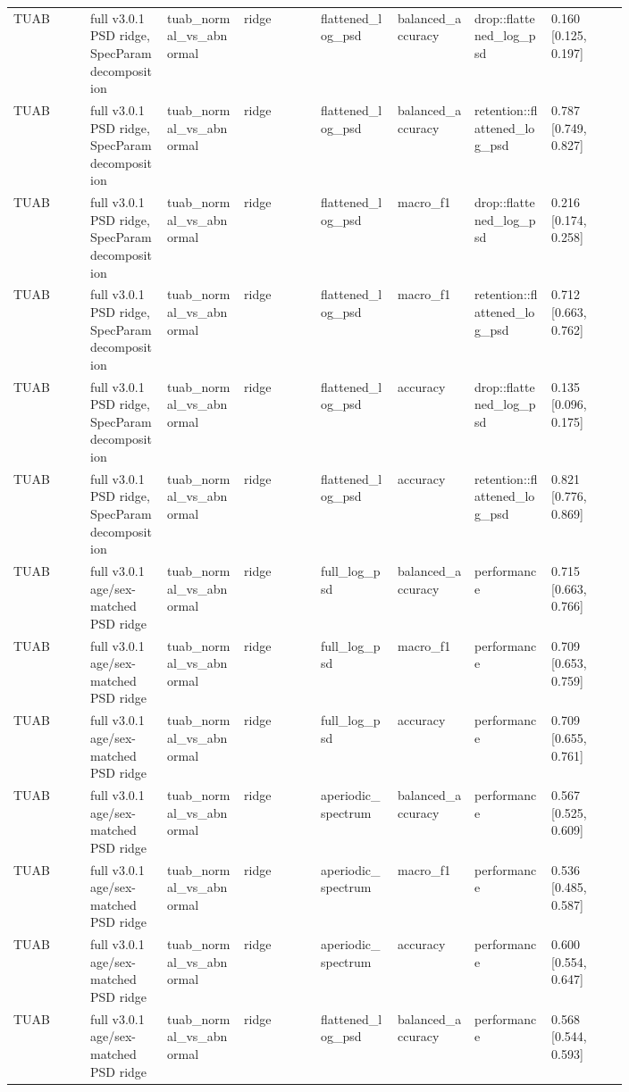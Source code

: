 \begin{longtable}{p{0.10\linewidth}p{0.10\linewidth}p{0.10\linewidth}p{0.10\linewidth}p{0.10\linewidth}p{0.10\linewidth}p{0.10\linewidth}p{0.10\linewidth}}
TUAB & full v3.0.1 PSD ridge, SpecParam decomposition & tuab\_normal\_vs\_abnormal & ridge & flattened\_log\_psd & balanced\_accuracy & drop::flattened\_log\_psd & 0.160 [0.125, 0.197]\\
TUAB & full v3.0.1 PSD ridge, SpecParam decomposition & tuab\_normal\_vs\_abnormal & ridge & flattened\_log\_psd & balanced\_accuracy & retention::flattened\_log\_psd & 0.787 [0.749, 0.827]\\
TUAB & full v3.0.1 PSD ridge, SpecParam decomposition & tuab\_normal\_vs\_abnormal & ridge & flattened\_log\_psd & macro\_f1 & drop::flattened\_log\_psd & 0.216 [0.174, 0.258]\\
TUAB & full v3.0.1 PSD ridge, SpecParam decomposition & tuab\_normal\_vs\_abnormal & ridge & flattened\_log\_psd & macro\_f1 & retention::flattened\_log\_psd & 0.712 [0.663, 0.762]\\
TUAB & full v3.0.1 PSD ridge, SpecParam decomposition & tuab\_normal\_vs\_abnormal & ridge & flattened\_log\_psd & accuracy & drop::flattened\_log\_psd & 0.135 [0.096, 0.175]\\
TUAB & full v3.0.1 PSD ridge, SpecParam decomposition & tuab\_normal\_vs\_abnormal & ridge & flattened\_log\_psd & accuracy & retention::flattened\_log\_psd & 0.821 [0.776, 0.869]\\
TUAB & full v3.0.1 age/sex-matched PSD ridge & tuab\_normal\_vs\_abnormal & ridge & full\_log\_psd & balanced\_accuracy & performance & 0.715 [0.663, 0.766]\\
TUAB & full v3.0.1 age/sex-matched PSD ridge & tuab\_normal\_vs\_abnormal & ridge & full\_log\_psd & macro\_f1 & performance & 0.709 [0.653, 0.759]\\
TUAB & full v3.0.1 age/sex-matched PSD ridge & tuab\_normal\_vs\_abnormal & ridge & full\_log\_psd & accuracy & performance & 0.709 [0.655, 0.761]\\
TUAB & full v3.0.1 age/sex-matched PSD ridge & tuab\_normal\_vs\_abnormal & ridge & aperiodic\_spectrum & balanced\_accuracy & performance & 0.567 [0.525, 0.609]\\
TUAB & full v3.0.1 age/sex-matched PSD ridge & tuab\_normal\_vs\_abnormal & ridge & aperiodic\_spectrum & macro\_f1 & performance & 0.536 [0.485, 0.587]\\
TUAB & full v3.0.1 age/sex-matched PSD ridge & tuab\_normal\_vs\_abnormal & ridge & aperiodic\_spectrum & accuracy & performance & 0.600 [0.554, 0.647]\\
TUAB & full v3.0.1 age/sex-matched PSD ridge & tuab\_normal\_vs\_abnormal & ridge & flattened\_log\_psd & balanced\_accuracy & performance & 0.568 [0.544, 0.593]\\

\end{longtable}
